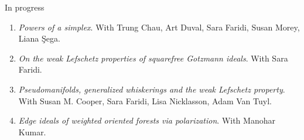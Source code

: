 \documentclass{resume} %
\begin{document}
\begin{rSection}{In progress}

    \begin{enumerate}
        \item \textit{Powers of a simplex}. With Trung Chau, Art Duval, Sara Faridi, Susan Morey, Liana \c{S}ega.
        \item \textit{On the weak Lefschetz properties of squarefree Gotzmann ideals}. With Sara Faridi. 
        \item \textit{Pseudomanifolds, generalized whiskerings and the weak Lefschetz property}. With Susan M. Cooper, Sara Faridi, Lisa Nicklasson, Adam Van Tuyl. 
        \item \textit{Edge ideals of weighted oriented forests via polarization}. With Manohar Kumar. 
    \end{enumerate}
\end{rSection}

\newpage
\end{document}
